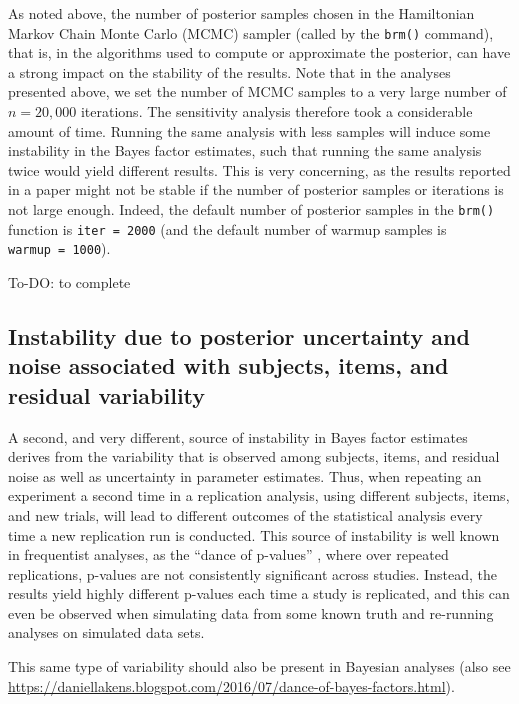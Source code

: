 \documentclass[12pt,]{krantz}
\theoremstyle{definition}
\theoremstyle{definition}
\theoremstyle{definition}
\theoremstyle{remark}
\begin{document}
As noted above, the number of posterior samples chosen in the Hamiltonian Markov Chain Monte Carlo (MCMC) sampler (called by the \texttt{brm()} command), that is, in the algorithms used to compute or approximate the posterior, can have a strong impact on the stability of the results. Note that in the analyses presented above, we set the number of MCMC samples to a very large number of \(n = 20,000\) iterations. The sensitivity analysis therefore took a considerable amount of time. Running the same analysis with less samples will induce some instability in the Bayes factor estimates, such that running the same analysis twice would yield different results. This is very concerning, as the results reported in a paper might not be stable if the number of posterior samples or iterations is not large enough. Indeed, the default number of posterior samples in the \texttt{brm()} function is \texttt{iter\ =\ 2000} (and the default number of warmup samples is \texttt{warmup\ =\ 1000}).

To-DO: to complete

\hypertarget{instability-due-to-posterior-uncertainty-and-noise-associated-with-subjects-items-and-residual-variability}{%
\subsection{Instability due to posterior uncertainty and noise associated with subjects, items, and residual variability}\label{instability-due-to-posterior-uncertainty-and-noise-associated-with-subjects-items-and-residual-variability}}

A second, and very different, source of instability in Bayes factor estimates derives from the variability that is observed among subjects, items, and residual noise as well as uncertainty in parameter estimates. Thus, when repeating an experiment a second time in a replication analysis, using different subjects, items, and new trials, will lead to different outcomes of the statistical analysis every time a new replication run is conducted. This source of instability is well known in frequentist analyses, as the ``dance of p-values'' \citep{cumming2014new}, where over repeated replications, p-values are not consistently significant across studies. Instead, the results yield highly different p-values each time a study is replicated, and this can even be observed when simulating data from some known truth and re-running analyses on simulated data sets.

This same type of variability should also be present in Bayesian analyses (also see \url{https://daniellakens.blogspot.com/2016/07/dance-of-bayes-factors.html}).
\end{document}
